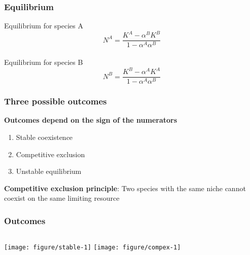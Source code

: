 \documentclass[color=usenames,dvipsnames]{beamer}\usepackage[]{graphicx}\usepackage[]{xcolor}
\begin{document}
\begin{frame}
  \frametitle{Equilibrium}
  \Large
  Equilibrium for species A
  \[
    N^A = \frac{K^A - \alpha^B K^B}{1 - \alpha^A \alpha^B}
  \] \\
  \vspace{1cm}
  \pause
  Equilibrium for species B
  \[
    N^B = \frac{K^B - \alpha^A K^A}{1 - \alpha^A \alpha^B}
  \]
\end{frame}


\begin{frame}
  \frametitle{Three possible outcomes}
  \large
  {\bf Outcomes depend on the sign of the numerators}
  \begin{enumerate}[(1)]
    \item Stable coexistence
    \item Competitive exclusion
    \item Unstable equilibrium
  \end{enumerate}
  \pause
  \vfill
    \large %
    {\bf Competitive exclusion principle}:
    Two species with the same niche cannot coexist on the same limiting resource
\end{frame}






\begin{frame}
  \frametitle{Outcomes}
  \vspace{-1cm}


\begin{columns}
  \column{\dimexpr\paperwidth-10pt}
    \texttt{[image: figure/stable-1]}
    \texttt{[image: figure/compex-1]}
\end{columns}
\end{frame}
\end{document}
